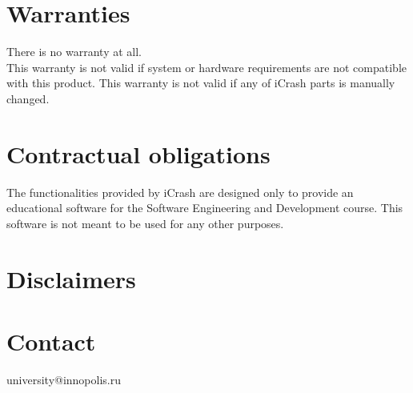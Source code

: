 \section{Warranties}
There is no warranty at all.\\				
This warranty is not valid if system or hardware requirements are not compatible with this product. This warranty is not valid if any of iCrash parts is manually changed. 
\section{Contractual obligations}
The functionalities provided by iCrash are designed only to provide an educational software for the Software Engineering and Development course. This software is not meant to be used for any other purposes. 

\section{Disclaimers}

\section{Contact}
university@innopolis.ru